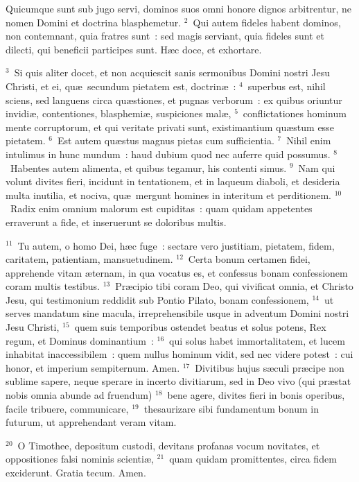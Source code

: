 \bchapter
\lettrine[lines=3,image=true,loversize=0.05,lraise=-0.03]{Q}{}uicumque sunt sub jugo servi, dominos suos omni honore dignos arbitrentur, ne nomen Domini et doctrina blasphemetur.
${}^{2}$~Qui autem fideles habent dominos, non contemnant, quia fratres sunt~: sed magis serviant, quia fideles sunt et dilecti, qui beneficii participes sunt. H\ae c doce, et exhortare.


${}^{3}$~Si quis aliter docet, et non acquiescit sanis sermonibus Domini nostri Jesu Christi, et ei, qu\ae\ secundum pietatem est, doctrin\ae~:
${}^{4}$~superbus est, nihil sciens, sed languens circa qu\ae stiones, et pugnas verborum~: ex quibus oriuntur invidi\ae , contentiones, blasphemi\ae , suspiciones mal\ae ,
${}^{5}$~conflictationes hominum mente corruptorum, et qui veritate privati sunt, existimantium qu\ae stum esse pietatem.
${}^{6}$~Est autem qu\ae stus magnus pietas cum sufficientia.
${}^{7}$~Nihil enim intulimus in hunc mundum~: haud dubium quod nec auferre quid possumus.
${}^{8}$~Habentes autem alimenta, et quibus tegamur, his contenti simus.
${}^{9}$~Nam qui volunt divites fieri, incidunt in tentationem, et in laqueum diaboli, et desideria multa inutilia, et nociva, qu\ae\ mergunt homines in interitum et perditionem.
${}^{10}$~Radix enim omnium malorum est cupiditas~: quam quidam appetentes erraverunt a fide, et inseruerunt se doloribus multis.


${}^{11}$~Tu autem, o homo Dei, h\ae c fuge~: sectare vero justitiam, pietatem, fidem, caritatem, patientiam, mansuetudinem.
${}^{12}$~Certa bonum certamen fidei, apprehende vitam \ae ternam, in qua vocatus es, et confessus bonam confessionem coram multis testibus.
${}^{13}$~Pr\ae cipio tibi coram Deo, qui vivificat omnia, et Christo Jesu, qui testimonium reddidit sub Pontio Pilato, bonam confessionem,
${}^{14}$~ut serves mandatum sine macula, irreprehensibile usque in adventum Domini nostri Jesu Christi,
${}^{15}$~quem suis temporibus ostendet beatus et solus potens, Rex regum, et Dominus dominantium~:
${}^{16}$~qui solus habet immortalitatem, et lucem inhabitat inaccessibilem~: quem nullus hominum vidit, sed nec videre potest~: cui honor, et imperium sempiternum. Amen.
${}^{17}$~Divitibus hujus s\ae culi pr\ae cipe non sublime sapere, neque sperare in incerto divitiarum, sed in Deo vivo (qui pr\ae stat nobis omnia abunde ad fruendum)
${}^{18}$~bene agere, divites fieri in bonis operibus, facile tribuere, communicare,
${}^{19}$~thesaurizare sibi fundamentum bonum in futurum, ut apprehendant veram vitam.


${}^{20}$~O Timothee, depositum custodi, devitans profanas vocum novitates, et oppositiones falsi nominis scienti\ae ,
${}^{21}$~quam quidam promittentes, circa fidem exciderunt. Gratia tecum. Amen.
